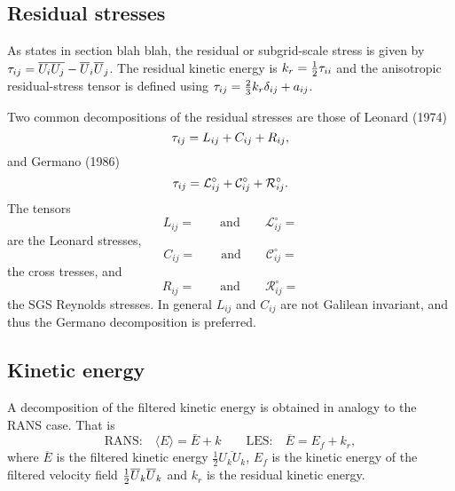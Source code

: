 \documentclass[oneside,a4paper,11pt]{report}
\begin{document}
\subsection{Residual stresses}
As states in section blah blah, the residual or subgrid-scale stress is given by $\tau_{ij} = \overline{ U_i U_j} - \overline{U}_i \overline{U}_j$. The residual kinetic energy is $k_r = \frac{1}{2} \tau_{ii}$ and the anisotropic residual-stress tensor is defined using $\tau_{ij} = \frac{2}{3} k_r \delta_{ij} + a_{ij}$.

Two common decompositions of the residual stresses are those of Leonard (1974)
\begin{equation}
\tau_{ij} = L_{ij} + C_{ij} + R_{ij},
\end{equation}
and Germano (1986)
\begin{equation}
\tau_{ij} = \mathcal{L}^\circ_{ij} + \mathcal{C}^\circ_{ij} + \mathcal{R}^\circ_{ij}.
\end{equation}
The tensors 
\begin{equation}
L_{ij} = \qquad \text{and} \qquad \mathcal{L}^\circ_{ij} = 
\end{equation}
are the Leonard stresses, 
\begin{equation}
C_{ij} = \qquad \text{and} \qquad \mathcal{C}^\circ_{ij} = 
\end{equation}
the cross tresses, and 
\begin{equation}
R_{ij} = \qquad \text{and} \qquad \mathcal{R}^\circ_{ij} = 
\end{equation}
the SGS Reynolds stresses. In general $L_{ij}$ and $C_{ij}$ are not Galilean invariant, and thus the Germano decomposition is preferred.

\subsection{Kinetic energy}
A decomposition of the filtered kinetic energy is obtained in analogy to the RANS case. That is
\begin{equation}
\text{RANS:}\quad \langle E \rangle = \bar{E} + k \qquad \text{LES:} \quad \overline{E} = E_f + k_r,
\end{equation}
where $\overline{E}$ is the filtered kinetic energy $\frac{1}{2} \overline{ U_k U_k}$, $E_f$ is the kinetic energy of the filtered velocity field $\frac{1}{2} \overline{U}_k \overline{U}_k$ and $k_r$ is the residual kinetic energy.
\end{document}
